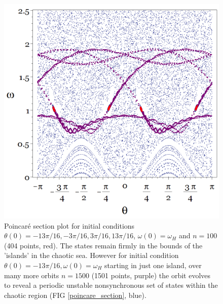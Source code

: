 \documentclass[10pt, twocolumn]{article} %
\begin{document}
\begin{figure}[tb!]
  \centering
  \includegraphics[width=0.95\columnwidth]{unstable_islands.png}
  \caption{Poincar\'e section plot for initial conditions $\theta(0) = -13\pi/16, -3\pi/16, 3\pi/16, 13\pi/16$, $\omega(0) = \omega_H$ and $n = 100$ (404 points, red). The states remain firmly in the bounds of the 'islands' in the chaotic sea. However for initial condition $\theta(0) = -13\pi/16, \omega(0) = \omega_H$ starting in just one island, over many more orbits $n = 1500$ (1501 points, purple) the orbit evolves to reveal a periodic unstable nonsynchronous set of states within the chaotic region (FIG \ref{poincare_section}, blue).}
  \label{poincare_islands}
\end{figure}
\end{document}
